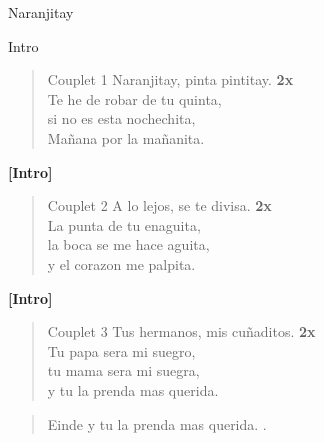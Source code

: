 \begin{song}[huayno]{Naranjitay}

\begin{instrumental}{Intro}
\measure{}\measure{}\measure{}\measure{}\measure{}\measure{}
\measure{}\measure{}
\end{instrumental}


\begin{verse}{Couplet 1}
Naranjitay, pinta pintitay. \textbf{2x}\\
Te he de robar de tu quinta,\\
si no es esta nochechita,\\
Ma\~nana por la ma\~nanita.
\end{verse}

\textbf{[Intro]}\\

\begin{verse}{Couplet 2}
A lo lejos, se te divisa. \textbf{2x}\\
La punta de tu enaguita,\\
la boca se me hace aguita,\\
y el corazon me palpita.
\end{verse}

\textbf{[Intro]}\\


\begin{verse}{Couplet 3}
Tus hermanos, mis cu\~naditos. \textbf{2x}\\
Tu papa sera mi suegro,\\
tu mama sera mi suegra,\\
y tu la prenda mas querida.
\end{verse}

\begin{verse}{Einde}
y tu la prenda mas querida. \hspace{3em} \hspace{1em} \hspace{1em} \hspace{1em}.
\end{verse}
\end{song} 
